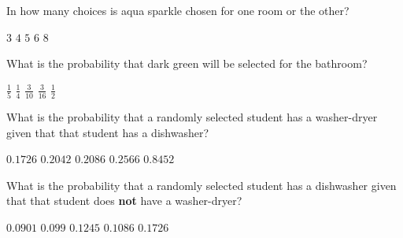 \documentclass[answers,12pt]{exam}
\begin{document}
\begin{questions}
\question
In how many choices is aqua sparkle chosen for
one room or the other?\\
\begin{oneparchoices}
\choice $3$
\correctchoice $4$
\choice $5$ %
\choice $6$ %
\choice $8$
\end{oneparchoices}

\question\label{LastColor}
What is the probability that dark green will be selected
for the bathroom?\\
\begin{oneparchoices}
\correctchoice $\frac{1}{5}$
\choice $\frac{1}{4}$ %
\choice $\frac{3}{10}$ %
\choice $\frac{3}{16}$ %
\choice $\frac{1}{2}$ %
\end{oneparchoices}


\question\label{FirstAmes} What is the probability that a randomly selected
student has a washer-dryer given that that student has a dishwasher?\\
\begin{oneparchoices}
\choice $0.1726$ %
\correctchoice $0.2042$
\choice $0.2086$ %
\choice $0.2566$ %
\choice $0.8452$ %
\end{oneparchoices}

\question\label{LastAmes} What is the probability that a randomly selected
student has a dishwasher given that that student does {\bf not}
have a washer-dryer?\\
\begin{oneparchoices}
\correctchoice $0.0901$
\choice $0.099$ %
\choice $0.1245$ %
\choice $0.1086$ %
\choice $0.1726$ %
\end{oneparchoices}



\end{questions}
\end{document}
